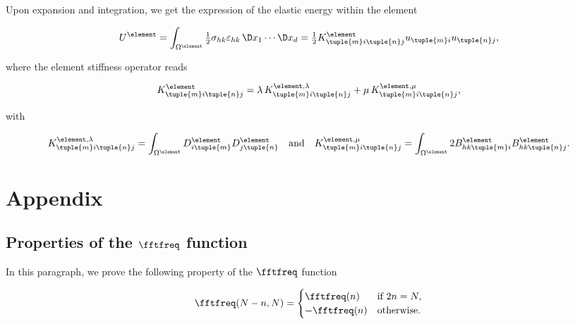 \documentclass[oneside]{memoir}
\begin{document}
Upon expansion and integration, we get the expression of the elastic energy within the element



\begin{equation*}
\begin{split}U^\element
=\int_{\Omega^\element}\tfrac12\sigma_{hk}\varepsilon_{hk}\,\D x_1\cdots\D x_d
=\tfrac12K^\element_{\tuple{m}i\tuple{n}j}u_{\tuple{m}i}u_{\tuple{n}j},\end{split}\end{equation*}


where the element stiffness operator reads



\begin{equation*}
\begin{split}K^\element_{\tuple{m}i\tuple{n}j}
=\lambda\,K^{\element, \lambda}_{\tuple{m}i\tuple{n}j}
+\mu\,K^{\element, \mu}_{\tuple{m}i\tuple{n}j},\end{split}\end{equation*}


with



\begin{equation*}
\begin{split}K^{\element, \lambda}_{\tuple{m}i\tuple{n}j}
=\int_{\Omega^\element}D^\element_{i\tuple{m}}D^\element_{j\tuple{n}}
\quad\text{and}\quad
K^{\element, \mu}_{\tuple{m}i\tuple{n}j}
=\int_{\Omega^\element} 2 B^\element_{hk\tuple{m}i}B^\element_{hk\tuple{n}j}.\end{split}\end{equation*}


\hypertarget{2489772129592300935}{}


\chapter{Appendix}



\hypertarget{18289269374885937903}{}


\section{Properties of the \(\fftfreq\) function}



In this paragraph, we prove the following property of the \(\fftfreq\) function



\begin{equation*}
\begin{split}\fftfreq(N-n, N)=
\begin{cases}
\fftfreq(n) & \text{if }2n=N,\\
-\fftfreq(n) & \text{otherwise.}
\end{cases}\end{split}\end{equation*}
\end{document}
